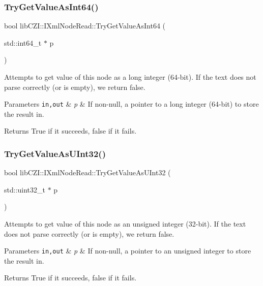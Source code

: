 \subsubsection{\texorpdfstring{Try\+Get\+Value\+As\+Int64()}{TryGetValueAsInt64()}}
{\footnotesize\ttfamily bool lib\+C\+Z\+I\+::\+I\+Xml\+Node\+Read\+::\+Try\+Get\+Value\+As\+Int64 (\begin{DoxyParamCaption}\item[{std\+::int64\+\_\+t $\ast$}]{p }\end{DoxyParamCaption})}

Attempts to get value of this node as a long integer (64-\/bit). If the text does not parse correctly (or is empty), we return false. 
\begin{DoxyParams}[1]{Parameters}
\mbox{\tt in,out}  & {\em p} & If non-\/null, a pointer to a long integer (64-\/bit) to store the result in. \\
\hline
\end{DoxyParams}
\begin{DoxyReturn}{Returns}
True if it succeeds, false if it fails. 
\end{DoxyReturn}
\mbox{\label{classlib_c_z_i_1_1_i_xml_node_read_a0cbe508500066393c05e5ebdfc3c7df7}} 
\subsubsection{\texorpdfstring{Try\+Get\+Value\+As\+U\+Int32()}{TryGetValueAsUInt32()}}
{\footnotesize\ttfamily bool lib\+C\+Z\+I\+::\+I\+Xml\+Node\+Read\+::\+Try\+Get\+Value\+As\+U\+Int32 (\begin{DoxyParamCaption}\item[{std\+::uint32\+\_\+t $\ast$}]{p }\end{DoxyParamCaption})}

Attempts to get value of this node as an unsigned integer (32-\/bit). If the text does not parse correctly (or is empty), we return false. 
\begin{DoxyParams}[1]{Parameters}
\mbox{\tt in,out}  & {\em p} & If non-\/null, a pointer to an unsigned integer to store the result in. \\
\hline
\end{DoxyParams}
\begin{DoxyReturn}{Returns}
True if it succeeds, false if it fails. 
\end{DoxyReturn}
\mbox{\label{classlib_c_z_i_1_1_i_xml_node_read_a6a250a2916f16985eff64b7a82ed2d99}} 
